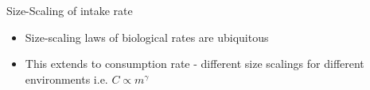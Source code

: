 \documentclass[xcolor={table}]{beamer}
\begin{document}
\begin{frame}[fragile=singleslide,t]
\begin{columns}[onlytextwidth,T]
\begin{column}{.47\textwidth}
\begin{block}{Size-Scaling of intake rate}
    \begin{itemize}
        \item Size-scaling laws of biological rates are ubiquitous \autocite{peters1983}
        \item This extends to consumption rate - different size scalings for different environments i.e. $C \propto m^\gamma$ \autocite{Pawar2012}
    \end{itemize}

         

\end{block}
\end{column}
\end{columns}
\end{frame}
\end{document}
